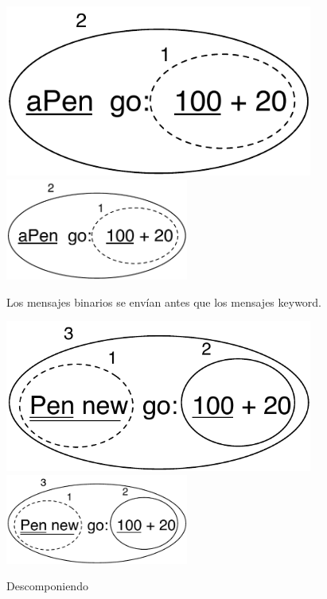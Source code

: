 \documentclass[a4paper,10pt,twoside]{book}
\begin{document}
\begin{figure}[htb]
\begin{minipage}{0.48\textwidth}
	\ifluluelse
		{\centerline{\includegraphics[width=0.9\textwidth]{uKeyBin}}}
		{\centerline{\includegraphics[width=6cm]{uKeyBin}}}
	\caption{Los mensajes binarios se env\'ian antes que los mensajes keyword.}
\end{minipage}
\hfill
\begin{minipage}{0.48\textwidth}
	\begin{center}
	\ifluluelse
		{\includegraphics[width=0.9\textwidth]{uunKeyBin}}
		{\includegraphics[width=6cm]{uunKeyBin}}
\caption{Descomponiendo }
\end{center}
\end{minipage}
\end{figure}
\end{document}
